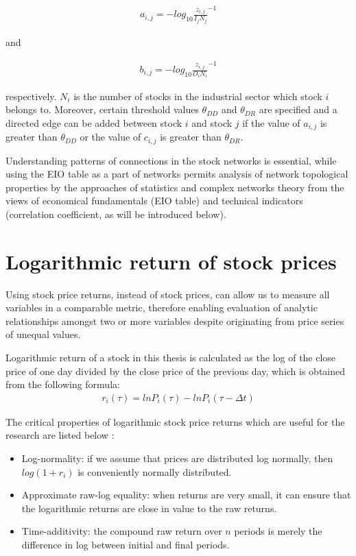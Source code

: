 \begin{eqnarray}\label{equ:eio_i}
a_{i,j} = -log_{10}{\frac{z_{i,j}}{I_j N_j}}^{-1}
\end{eqnarray}

and

\begin{eqnarray}\label{equ:eio_o}
b_{i,j} = -log_{10}{\frac{z_{i,j}}{O_i N_i}}^{-1}
\end{eqnarray}

respectively. $N_i$ is the number of stocks in the industrial sector which stock $i$ belongs to. Moreover, certain threshold values $\theta_{DD}$ and $\theta_{DR}$ are specified and a directed edge can be added between stock $i$ and stock $j$ if the value of $a_{i,j}$ is greater than $\theta_{DD}$ or the value of $c_{i,j}$ is greater than $\theta_{DR}$.

Understanding patterns of connections in the stock networks is essential, while using the EIO table as a part of networks permits analysis of network topological properties by the approaches of statistics and complex networks theory from the views of economical fundamentals (EIO table) and technical indicators (correlation coefficient, as will be introduced below).

\section{Logarithmic return of stock prices}
Using stock price returns, instead of stock prices, can allow us to measure all variables in a comparable metric, therefore enabling evaluation of analytic relationships amongst two or more variables despite originating from price series of unequal values.

Logarithmic return of a stock in this thesis is calculated as the log of the close price of one day divided by the close price of the previous day, which is obtained from the following formula:
\begin{eqnarray}\label{equ:log}
r_i(\tau)=lnP_i(\tau)-lnP_i(\tau-\Delta t)
\end{eqnarray}

The critical properties of logarithmic stock price returns which are useful for the research are listed below :
\begin{itemize}
	\item Log-normality: if we assume that prices are distributed log normally, then $log(1 + r_i)$ is conveniently normally distributed.
	\item Approximate raw-log equality: when returns are very small, it can ensure that the logarithmic returns are close in value to the raw returns.
	\item Time-additivity: the compound raw return over $n$ periods is merely the difference in log between initial and final periods.
\end{itemize}

